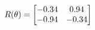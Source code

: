 \documentclass[preview]{standalone}
\begin{document}
\begin{align*}
\special{dvisvgm:raw <g id='unique000'>}R(\theta) = \begin{bmatrix}-0.34 & 0.94\\-0.94 & -0.34\end{bmatrix}\special{dvisvgm:raw </g>}
\end{align*}
\end{document}
